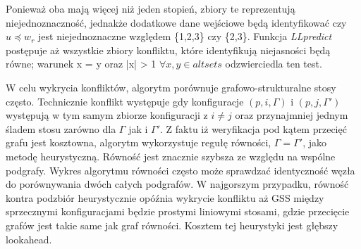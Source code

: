 Ponieważ oba mają więcej niż jeden stopień, zbiory te reprezentują niejednoznaczność,
jednakże dodatkowe dane wejściowe będą identyfikować czy $u \preceq w_r$ jest niejednoznaczne
względem \{1,2,3\} czy \{2,3\}.
Funkcja \textit{LLpredict} postępuje aż wszystkie zbiory konfliktu, które identyfikują niejasności
będą równe; warunek x = y oraz |x| > 1  $\forall x,y \in altsets$ odzwierciedla ten test.
\par
W celu wykrycia konfliktów, algorytm porównuje grafowo-strukturalne stosy często.
Technicznie konflikt występuje gdy konfiguracje $(p, i, \Gamma)$ i $(p, j, \Gamma')$
występują w tym samym zbiorze konfiguracji z $i \neq j$ oraz przynajmniej jednym
śladem stosu zarówno dla $\Gamma$ jak i $\Gamma'$.
Z faktu iż weryfikacja pod kątem przecięć grafu jest kosztowna, algorytm wykorzystuje
regułę równości, $\Gamma = \Gamma'$, jako metodę heurystyczną.
Równość jest znacznie szybsza ze względu na wspólne podgrafy.
Wykres algorytmu równości często może sprawdzać identyczność węzła do porównywania dwóch
całych podgrafów. W najgorszym przypadku, równość kontra podzbiór heurystycznie opóźnia
wykrycie konfliktu aż GSS między sprzecznymi konfiguracjami będzie prostymi liniowymi stosami,
gdzie przecięcie grafów jest takie same jak graf równości.
Kosztem tej heurystyki jest głębszy lookahead.

